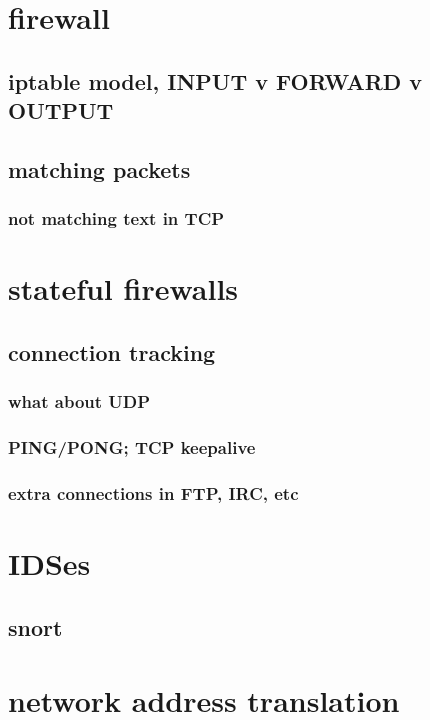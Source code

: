 \section{firewall}

\subsection{iptable model, INPUT v FORWARD v OUTPUT}

\subsection{matching packets}

\subsubsection{not matching text in TCP}

\section{stateful firewalls}

\subsection{connection tracking}

\subsubsection{what about UDP}

\subsubsection{PING/PONG; TCP keepalive}

\subsubsection{extra connections in FTP, IRC, etc}

\section{IDSes}

\subsection{snort}

\section{network address translation}


